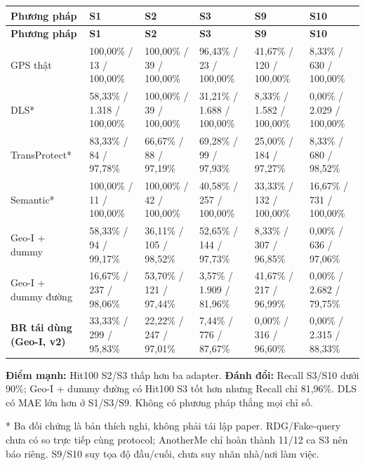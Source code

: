 \begingroup\small
\begin{longtable}{@{}P{2.804cm}P{2.598cm}P{2.598cm}P{2.598cm}P{2.598cm}P{2.598cm}@{}}
\toprule
\textbf{Phương pháp} & \textbf{S1} & \textbf{S2} & \textbf{S3} & \textbf{S9} & \textbf{S10}\\\midrule
\endfirsthead
\toprule
\textbf{Phương pháp} & \textbf{S1} & \textbf{S2} & \textbf{S3} & \textbf{S9} & \textbf{S10}\\\midrule
\endhead
\bottomrule\endfoot
GPS thật & 100,00\% / 13 / 100,00\% & 100,00\% / 39 / 100,00\% & 96,43\% / 23 / 100,00\% & 41,67\% / 120 / 100,00\% & 8,33\% / 630 / 100,00\%\\
\addlinespace[3pt]
DLS* & 58,33\% / 1.318 / 100,00\% & 100,00\% / 39 / 100,00\% & 31,21\% / 1.688 / 100,00\% & 8,33\% / 1.582 / 100,00\% & 0,00\% / 2.029 / 100,00\%\\
\addlinespace[3pt]
TransProtect* & 83,33\% / 84 / 97,78\% & 66,67\% / 88 / 97,19\% & 69,28\% / 99 / 97,93\% & 25,00\% / 184 / 97,27\% & 8,33\% / 680 / 98,52\%\\
\addlinespace[3pt]
Semantic* & 100,00\% / 11 / 100,00\% & 100,00\% / 42 / 100,00\% & 40,58\% / 257 / 100,00\% & 33,33\% / 132 / 100,00\% & 16,67\% / 731 / 100,00\%\\
\addlinespace[3pt]
Geo-I + dummy & 58,33\% / 94 / 99,17\% & 36,11\% / 105 / 98,52\% & 52,65\% / 144 / 97,73\% & 8,33\% / 307 / 96,85\% & 0,00\% / 636 / 97,06\%\\
\addlinespace[3pt]
Geo-I + dummy đường & 16,67\% / 237 / 98,06\% & 53,70\% / 121 / 97,44\% & 3,57\% / 1.909 / 81,96\% & 41,67\% / 217 / 96,99\% & 0,00\% / 2.682 / 79,75\%\\
\addlinespace[3pt]
\textbf{BR tái dùng (Geo-I, v2)} & 33,33\% / 299 / 95,83\% & 22,22\% / 247 / 97,01\% & 7,44\% / 776 / 87,67\% & 0,00\% / 316 / 96,60\% & 0,00\% / 2.315 / 88,33\%\\
\end{longtable}
\endgroup
{}

\textbf{Điểm mạnh:} Hit100 S2/S3 thấp hơn ba adapter. \textbf{Đánh đổi:} Recall S3/S10 dưới 90\%; Geo-I + dummy đường có Hit100 S3 tốt hơn nhưng Recall chỉ 81,96\%. DLS có MAE lớn hơn ở S1/S3/S9. Không có phương pháp thắng mọi chỉ số.

* Ba đối chứng là bản thích nghi, không phải tái lập paper. RDG/Fake-query chưa có so trực tiếp cùng protocol; AnotherMe chỉ hoàn thành 11/12 ca S3 nên báo riêng. S9/S10 suy tọa độ đầu/cuối, chưa suy nhãn nhà/nơi làm việc.


